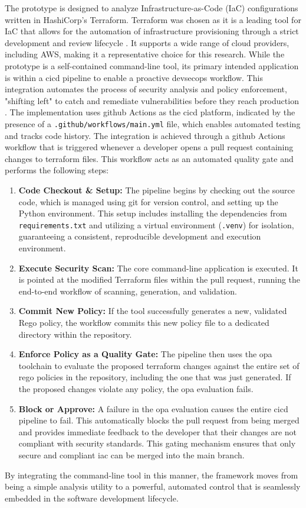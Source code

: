 The prototype is designed to analyze Infrastructure-as-Code (IaC) configurations written in HashiCorp's Terraform. Terraform was chosen as it is a leading tool for IaC that allows for the automation of infrastructure provisioning through a strict development and review lifecycle \cite{brikman2022terraform}. It supports a wide range of cloud providers, including AWS, making it a representative choice for this research.
While the prototype is a self-contained command-line tool, its primary intended application is within a \gls{cicd} pipeline to enable a proactive \gls{devsecops} workflow. This integration automates the process of security analysis and policy enforcement, "shifting left" to catch and remediate vulnerabilities before they reach production \cite{delicheh_mitigating_2024}. The implementation uses \gls{github} Actions as the \gls{cicd} platform, indicated by the presence of a \texttt{.github/workflows/main.yml} file, which enables automated testing and tracks code history. The integration is achieved through a \gls{github} Actions workflow that is triggered whenever a developer opens a pull request containing changes to \gls{terraform} files. This workflow acts as an automated quality gate and performs the following steps:
\begin{enumerate}
    \item \textbf{Code Checkout \& Setup:} The pipeline begins by checking out the source code, which is managed using \gls{git} for version control, and setting up the Python environment. This setup includes installing the dependencies from \texttt{requirements.txt} and utilizing a virtual environment (\texttt{.venv}) for isolation, guaranteeing a consistent, reproducible development and execution environment.
    \item \textbf{Execute Security Scan:} The core command-line application is executed. It is pointed at the modified Terraform files within the pull request, running the end-to-end workflow of scanning, generation, and validation.
    \item \textbf{Commit New Policy:} If the tool successfully generates a new, validated Rego policy, the workflow commits this new policy file to a dedicated directory within the repository.
    \item \textbf{Enforce Policy as a Quality Gate:} The pipeline then uses the \gls{opa} toolchain to evaluate the proposed \gls{terraform} changes against the entire set of \gls{rego} policies in the repository, including the one that was just generated. If the proposed changes violate any policy, the \gls{opa} evaluation fails.
    \item \textbf{Block or Approve:} A failure in the \gls{opa} evaluation causes the entire \gls{cicd} pipeline to fail. This automatically blocks the pull request from being merged and provides immediate feedback to the developer that their changes are not compliant with security standards. This gating mechanism ensures that only secure and compliant \gls{iac} can be merged into the main branch.
\end{enumerate}
By integrating the command-line tool in this manner, the framework moves from being a simple analysis utility to a powerful, automated control that is seamlessly embedded in the software development lifecycle.

